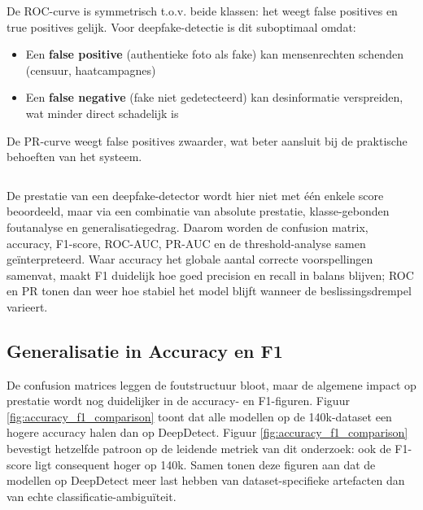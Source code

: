De ROC-curve is symmetrisch t.o.v. beide klassen: het weegt false positives en true positives gelijk. Voor deepfake-detectie is dit suboptimaal omdat:

\begin{itemize}
    \item Een \textbf{false positive} (authentieke foto als fake) kan mensenrechten schenden (censuur, haatcampagnes)
    \item Een \textbf{false negative} (fake niet gedetecteerd) kan desinformatie verspreiden, wat minder direct schadelijk is
\end{itemize}

De PR-curve weegt false positives zwaarder, wat beter aansluit bij de praktische behoeften van het systeem.

\begin{listing}[H]
    \inputminted[fontsize=\footnotesize, linenos, frame=lines]{python}{code/eval_function.py}
    \caption{Python script voor de evaluatiemetrieken en scoreberekening.}
    \label{lst:eval_function}
\end{listing}

De prestatie van een deepfake-detector wordt hier niet met één enkele score beoordeeld, maar via een combinatie van absolute prestatie, klasse-gebonden foutanalyse en generalisatiegedrag. Daarom worden de confusion matrix, accuracy, F1-score, ROC-AUC, PR-AUC en de threshold-analyse samen geïnterpreteerd. Waar accuracy het globale aantal correcte voorspellingen samenvat, maakt F1 duidelijk hoe goed precision en recall in balans blijven; ROC en PR tonen dan weer hoe stabiel het model blijft wanneer de beslissingsdrempel varieert.


\subsection{Generalisatie in Accuracy en F1}

De confusion matrices leggen de foutstructuur bloot, maar de algemene impact op prestatie wordt nog duidelijker in de accuracy- en F1-figuren. Figuur \ref{fig:accuracy_f1_comparison} toont dat alle modellen op de 140k-dataset een hogere accuracy halen dan op DeepDetect. Figuur \ref{fig:accuracy_f1_comparison} bevestigt hetzelfde patroon op de leidende metriek van dit onderzoek: ook de F1-score ligt consequent hoger op 140k. Samen tonen deze figuren aan dat de modellen op DeepDetect meer last hebben van dataset-specifieke artefacten dan van echte classificatie-ambiguïteit.

